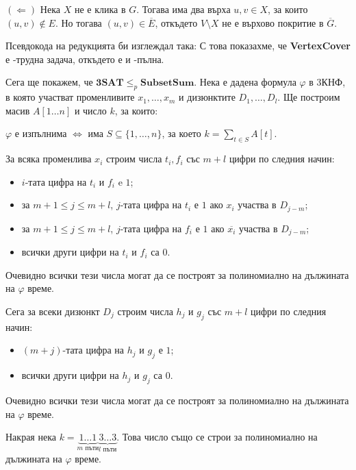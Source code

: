 $(\Leftarrow)$
Нека $X$ не е клика в $G$.
Тогава има два върха $u, v \in X$, за които $(u, v) \notin E$.
Но тогава $(u, v) \in \overline{E}$, откъдето $V \setminus X$ не е върхово покритие в $\overline{G}$.

Псевдокода на редукцията би изглеждал така:
С това показахме, че \textbf{VertexCover} е \NP-трудна задача, откъдето е и \NP-пълна.

Сега ще покажем, че $\mathbf{3SAT} \leq_p \mathbf{SubsetSum}$.
Нека е дадена формула $\varphi$ в 3КНФ, в която участват променливите $x_1, \dots, x_m$ и дизюнктите $D_1, \dots, D_l$.
Ще построим масив $A[1 \dots n]$ и число $k$, за които:
\begin{center}
    $\varphi$ е изпълнима $\iff$ има $S \subseteq \{ 1, \dots, n \}$, за което $k = \sum\limits_{t \in S} A[t]$.
\end{center}
За всяка променлива $x_i$ строим числа $t_i, f_i$ със $m + l$ цифри по следния начин:
\begin{itemize}
    \item $i$-тата цифра на $t_i$ и $f_i$ e $1$;
    \item за $m + 1 \leq j \leq m + l$, $j$-тата цифра на $t_i$ е $1$ ако $x_i$ участва в $D_{j - m}$;
    \item за $m + 1 \leq j \leq m + l$, $j$-тата цифра на $f_i$ е $1$ ако $\overline{x_i}$ участва в $D_{j - m}$;
    \item всички други цифри на $t_i$ и $f_i$ са $0$.
\end{itemize}
Очевидно всички тези числа могат да се построят за полиномиално на дължината на $\varphi$ време.

Сега за всеки дизюнкт $D_j$ строим числа $h_j$ и $g_j$ със $m + l$ цифри по следния начин:
\begin{itemize}
    \item $(m + j)$-тата цифра на $h_j$ и $g_j$ е $1$;
    \item всички други цифри на $h_j$ и $g_j$ са $0$.
\end{itemize}

\newpage
Очевидно всички тези числа могат да се построят за полиномиално на дължината на $\varphi$ време.

Накрая нека $k = \underbrace{1 \dots 1}_{m \text{ пъти}} \underbrace{3 \dots 3}_{l \text{ пъти}}$.
Това число също се строи за полиномиално на дължината на $\varphi$ време.

